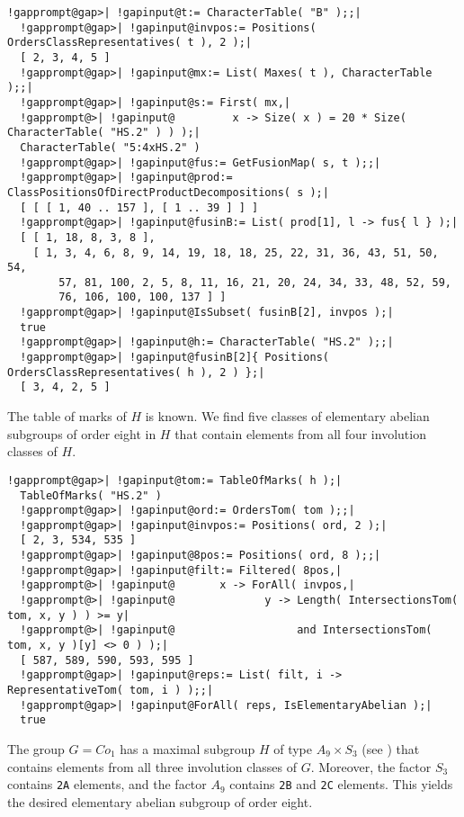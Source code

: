 \documentclass[a4paper,11pt]{report}
\begin{document}
{{{ 
\begin{Verbatim}[commandchars=!@|,fontsize=\small,frame=single,label=Example]
  !gapprompt@gap>| !gapinput@t:= CharacterTable( "B" );;|
  !gapprompt@gap>| !gapinput@invpos:= Positions( OrdersClassRepresentatives( t ), 2 );|
  [ 2, 3, 4, 5 ]
  !gapprompt@gap>| !gapinput@mx:= List( Maxes( t ), CharacterTable );;|
  !gapprompt@gap>| !gapinput@s:= First( mx,|
  !gapprompt@>| !gapinput@         x -> Size( x ) = 20 * Size( CharacterTable( "HS.2" ) ) );|
  CharacterTable( "5:4xHS.2" )
  !gapprompt@gap>| !gapinput@fus:= GetFusionMap( s, t );;|
  !gapprompt@gap>| !gapinput@prod:= ClassPositionsOfDirectProductDecompositions( s );|
  [ [ [ 1, 40 .. 157 ], [ 1 .. 39 ] ] ]
  !gapprompt@gap>| !gapinput@fusinB:= List( prod[1], l -> fus{ l } );|
  [ [ 1, 18, 8, 3, 8 ], 
    [ 1, 3, 4, 6, 8, 9, 14, 19, 18, 18, 25, 22, 31, 36, 43, 51, 50, 54, 
        57, 81, 100, 2, 5, 8, 11, 16, 21, 20, 24, 34, 33, 48, 52, 59, 
        76, 106, 100, 100, 137 ] ]
  !gapprompt@gap>| !gapinput@IsSubset( fusinB[2], invpos );|
  true
  !gapprompt@gap>| !gapinput@h:= CharacterTable( "HS.2" );;|
  !gapprompt@gap>| !gapinput@fusinB[2]{ Positions( OrdersClassRepresentatives( h ), 2 ) };|
  [ 3, 4, 2, 5 ]
\end{Verbatim}
 

 The table of marks of $H$ is known. We find five classes of elementary abelian subgroups of order eight
in $H$ that contain elements from all four involution classes of $H$. 

 
\begin{Verbatim}[commandchars=!@|,fontsize=\small,frame=single,label=Example]
  !gapprompt@gap>| !gapinput@tom:= TableOfMarks( h );|
  TableOfMarks( "HS.2" )
  !gapprompt@gap>| !gapinput@ord:= OrdersTom( tom );;|
  !gapprompt@gap>| !gapinput@invpos:= Positions( ord, 2 );|
  [ 2, 3, 534, 535 ]
  !gapprompt@gap>| !gapinput@8pos:= Positions( ord, 8 );;|
  !gapprompt@gap>| !gapinput@filt:= Filtered( 8pos,|
  !gapprompt@>| !gapinput@       x -> ForAll( invpos,|
  !gapprompt@>| !gapinput@              y -> Length( IntersectionsTom( tom, x, y ) ) >= y|
  !gapprompt@>| !gapinput@                   and IntersectionsTom( tom, x, y )[y] <> 0 ) );|
  [ 587, 589, 590, 593, 595 ]
  !gapprompt@gap>| !gapinput@reps:= List( filt, i -> RepresentativeTom( tom, i ) );;|
  !gapprompt@gap>| !gapinput@ForAll( reps, IsElementaryAbelian );|
  true
\end{Verbatim}
 

 The group $G = Co_1$ has a maximal subgroup $H$ of type $A_9 \times S_3$ (see \cite[p.{\nobreakspace}183]{CCN85}) that contains elements from all three involution classes of $G$. Moreover, the factor $S_3$ contains \texttt{2A} elements, and the factor $A_9$ contains \texttt{2B} and \texttt{2C} elements. This yields the desired elementary abelian subgroup of order eight. 

}}}
\end{document}
